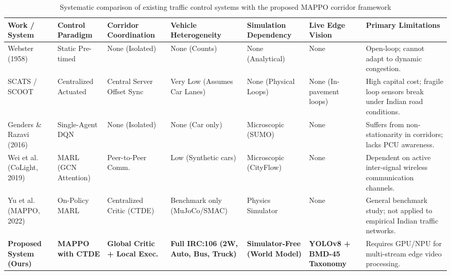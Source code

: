 \documentclass[12pt,a4paper,oneside]{report}
\begin{document}
\begin{table}[htbp]
\centering
\scriptsize
\setlength{\tabcolsep}{3pt}
\caption{Systematic comparison of existing traffic control systems with the proposed MAPPO corridor framework}
\label{tab:lit_survey_summary}
\begin{tabularx}{\textwidth}{|p{2.3cm}|p{1.7cm}|p{1.8cm}|p{1.9cm}|p{1.8cm}|p{1.8cm}|X|}
\hline
\textbf{Work / System} & \textbf{Control Paradigm} & \textbf{Corridor Coordination} & \textbf{Vehicle Heterogeneity} & \textbf{Simulation Dependency} & \textbf{Live Edge Vision} & \textbf{Primary Limitations} \\ \hline
Webster (1958) \cite{ref_webster1958} & Static Pre-timed & None (Isolated) & None (Counts) & None (Analytical) & None & Open-loop; cannot adapt to dynamic congestion. \\ \hline
SCATS / SCOOT \cite{ref_scats1980, ref_hunt1981} & Centralized Actuated & Central Server Offset Sync & Very Low (Assumes Car Lanes) & None (Physical Loops) & None (In-pavement loops) & High capital cost; fragile loop sensors break under Indian road conditions. \\ \hline
Genders \& Razavi (2016) \cite{ref_genders2016} & Single-Agent DQN & None (Isolated) & None (Car only) & Microscopic (SUMO) & None & Suffers from non-stationarity in corridors; lacks PCU awareness. \\ \hline
Wei et al. (CoLight, 2019) \cite{ref_wei2019colight} & MARL (GCN Attention) & Peer-to-Peer Comm. & Low (Synthetic cars) & Microscopic (CityFlow) & None & Dependent on active inter-signal wireless communication channels. \\ \hline
Yu et al. (MAPPO, 2022) \cite{ref_mappo2022} & On-Policy MARL & Centralized Critic (CTDE) & Benchmark only (MuJoCo/SMAC) & Physics Simulator & None & General benchmark study; not applied to empirical Indian traffic networks. \\ \hline
\textbf{Proposed System (Ours)} & \textbf{MAPPO with CTDE} & \textbf{Global Critic + Local Exec.} & \textbf{Full IRC:106 (2W, Auto, Bus, Truck)} & \textbf{Simulator-Free (World Model)} & \textbf{YOLOv8 + BMD-45 Taxonomy} & Requires GPU/NPU for multi-stream edge video processing. \\ \hline
\end{tabularx}
\end{table}
\end{document}
